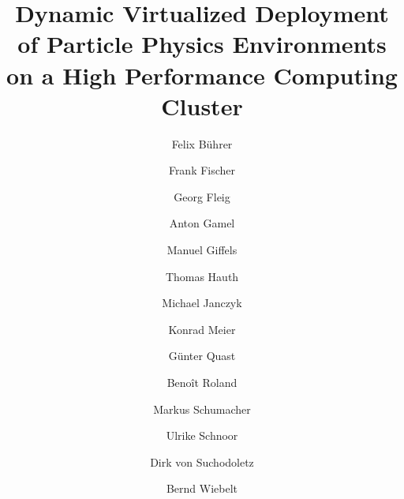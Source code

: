 %


\title{Dynamic Virtualized Deployment of Particle Physics Environments on a
  High Performance Computing Cluster%
}


%
%
\author{Felix B\"uhrer \and Frank Fischer \and Georg Fleig \and Anton
  Gamel \and Manuel Giffels \and Thomas Hauth \and Michael Janczyk
  \and Konrad Meier \and
G\"unter Quast \and  Beno\^it Roland \and
  Markus Schumacher \and Ulrike Schnoor \and Dirk von Suchodoletz \and Bernd Wiebelt
}




